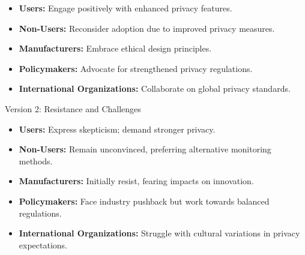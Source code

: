 \documentclass[11pt]{article}
\begin{document}
\begin{itemize}[label={},leftmargin=2em,itemsep=1pt,parsep=0pt]
  \item \textbf{Users:} Engage positively with enhanced privacy features.
  \item \textbf{Non-Users:} Reconsider adoption due to improved privacy measures.
  \item \textbf{Manufacturers:} Embrace ethical design principles.
  \item \textbf{Policymakers:} Advocate for strengthened privacy regulations.
  \item \textbf{International Organizations:} Collaborate on global privacy standards.
\end{itemize}

\noindent Version 2: Resistance and Challenges

\begin{itemize}[label={},leftmargin=2em,itemsep=1pt,parsep=0pt]
  \item \textbf{Users:} Express skepticism; demand stronger privacy.
  \item \textbf{Non-Users:} Remain unconvinced, preferring alternative monitoring methods.
  \item \textbf{Manufacturers:} Initially resist, fearing impacts on innovation.
  \item \textbf{Policymakers:} Face industry pushback but work towards balanced regulations.
  \item \textbf{International Organizations:} Struggle with cultural variations in privacy expectations.
\end{itemize}
\end{document}
